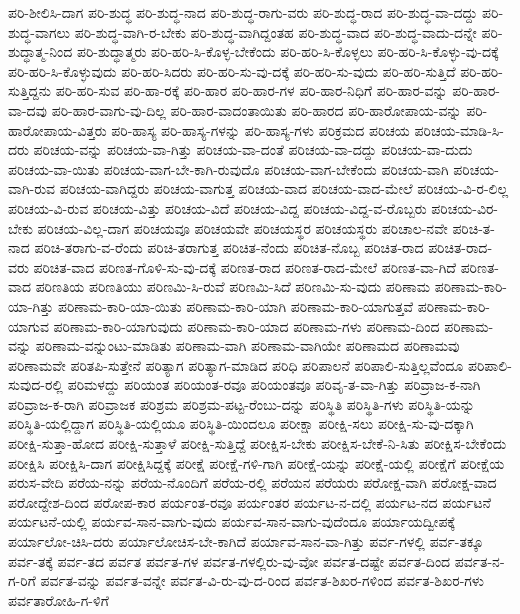 {ಪರಿ-ಶೀಲಿಸಿ-ದಾಗ
ಪರಿ-ಶುದ್ಧ
ಪರಿ-ಶುದ್ಧ-ನಾದ
ಪರಿ-ಶುದ್ಧ-ರಾಗು-ವರು
ಪರಿ-ಶುದ್ಧ-ರಾದ
ಪರಿ-ಶುದ್ಧ-ವಾ-ದದ್ದು
ಪರಿ-ಶುದ್ಧ-ವಾಗಲು
ಪರಿ-ಶುದ್ಧ-ವಾಗಿ-ರ-ಬೇಕು
ಪರಿ-ಶುದ್ಧ-ವಾಗಿದ್ದಂತಹ
ಪರಿ-ಶುದ್ಧ-ವಾದ
ಪರಿ-ಶುದ್ಧ-ವಾದು-ದನ್ನೇ
ಪರಿ-ಶುದ್ಧಾತ್ಮ-ನಿಂದ
ಪರಿ-ಶುದ್ಧಾತ್ಮರು
ಪರಿ-ಹರಿ-ಸಿ-ಕೊಳ್ಳ-ಬೇಕೆಂದು
ಪರಿ-ಹರಿ-ಸಿ-ಕೊಳ್ಳಲು
ಪರಿ-ಹರಿ-ಸಿ-ಕೊಳ್ಳು-ವು-ದಕ್ಕೆ
ಪರಿ-ಹರಿ-ಸಿ-ಕೊಳ್ಳುವುದು
ಪರಿ-ಹರಿ-ಸಿದರು
ಪರಿ-ಹರಿ-ಸು-ವು-ದಕ್ಕೆ
ಪರಿ-ಹರಿ-ಸು-ವುದು
ಪರಿ-ಹರಿ-ಸುತ್ತಿದೆ
ಪರಿ-ಹರಿ-ಸುತ್ತಿದ್ದನು
ಪರಿ-ಹರಿ-ಸುವ
ಪರಿ-ಹಾ-ರಕ್ಕೆ
ಪರಿ-ಹಾರ
ಪರಿ-ಹಾರ-ಗಳ
ಪರಿ-ಹಾರ-ನಿಧಿಗೆ
ಪರಿ-ಹಾರ-ವನ್ನು
ಪರಿ-ಹಾರ-ವಾ-ದವು
ಪರಿ-ಹಾರ-ವಾಗು-ವು-ದಿಲ್ಲ
ಪರಿ-ಹಾರ-ವಾದಂತಾಯಿತು
ಪರಿ-ಹಾರದ
ಪರಿ-ಹಾರೋಪಾಯ-ವನ್ನು
ಪರಿ-ಹಾರೋಪಾಯ-ವಿತ್ತರು
ಪರಿ-ಹಾಸ್ಯ
ಪರಿ-ಹಾಸ್ಯ-ಗಳನ್ನು
ಪರಿ-ಹಾಸ್ಯ-ಗಳು
ಪರಿಕ್ರಮದ
ಪರಿಚಯ
ಪರಿಚಯ-ಮಾಡಿ-ಸಿ-ದರು
ಪರಿಚಯ-ವನ್ನು
ಪರಿಚಯ-ವಾ-ಗಿತ್ತು
ಪರಿಚಯ-ವಾ-ದಂತೆ
ಪರಿಚಯ-ವಾ-ದದ್ದು
ಪರಿಚಯ-ವಾ-ದುದು
ಪರಿಚಯ-ವಾ-ಯಿತು
ಪರಿಚಯ-ವಾಗ-ಬೇ-ಕಾಗಿ-ರುವುದೊ
ಪರಿಚಯ-ವಾಗ-ಬೇಕೆಂದು
ಪರಿಚಯ-ವಾಗಿ
ಪರಿಚಯ-ವಾಗಿ-ರುವ
ಪರಿಚಯ-ವಾಗಿದ್ದರು
ಪರಿಚಯ-ವಾಗುತ್ತ
ಪರಿಚಯ-ವಾದ
ಪರಿಚಯ-ವಾದ-ಮೇಲೆ
ಪರಿಚಯ-ವಿ-ರ-ಲಿಲ್ಲ
ಪರಿಚಯ-ವಿ-ರುವ
ಪರಿಚಯ-ವಿತ್ತು
ಪರಿಚಯ-ವಿದೆ
ಪರಿಚಯ-ವಿದ್ದ
ಪರಿಚಯ-ವಿದ್ದ-ವ-ರೊಬ್ಬರು
ಪರಿಚಯ-ವಿರ-ಬೇಕು
ಪರಿಚಯ-ವಿಲ್ಲ-ದಾಗ
ಪರಿಚಯವೂ
ಪರಿಚಯವೇ
ಪರಿಚಯಸ್ಥರ
ಪರಿಚಯಸ್ಥರು
ಪರಿಚಾಲ-ನವೇ
ಪರಿಚಿ-ತ-ನಾದ
ಪರಿಚಿ-ತರಾಗು-ವ-ರೆಂದು
ಪರಿಚಿ-ತರಾಗುತ್ತ
ಪರಿಚಿತ-ನೆಂದು
ಪರಿಚಿತ-ನೊಬ್ಬ
ಪರಿಚಿತ-ರಾದ
ಪರಿಚಿತ-ರಾದ-ವರು
ಪರಿಚಿತ-ವಾದ
ಪರಿಣತ-ಗೊಳಿ-ಸು-ವು-ದಕ್ಕೆ
ಪರಿಣತ-ರಾದ
ಪರಿಣತ-ರಾದ-ಮೇಲೆ
ಪರಿಣತ-ವಾ-ಗಿದೆ
ಪರಿಣತ-ವಾದ
ಪರಿಣತಿಯ
ಪರಿಣತಿಯು
ಪರಿಣಮಿ-ಸಿ-ರುವೆ
ಪರಿಣಮಿ-ಸಿದೆ
ಪರಿಣಮಿ-ಸು-ವುದು
ಪರಿಣಾಮ
ಪರಿಣಾಮ-ಕಾರಿ-ಯಾ-ಗಿತ್ತು
ಪರಿಣಾಮ-ಕಾರಿ-ಯಾ-ಯಿತು
ಪರಿಣಾಮ-ಕಾರಿ-ಯಾಗಿ
ಪರಿಣಾಮ-ಕಾರಿ-ಯಾಗುತ್ತವೆ
ಪರಿಣಾಮ-ಕಾರಿ-ಯಾಗುವ
ಪರಿಣಾಮ-ಕಾರಿ-ಯಾಗುವುದು
ಪರಿಣಾಮ-ಕಾರಿ-ಯಾದ
ಪರಿಣಾಮ-ಗಳು
ಪರಿಣಾಮ-ದಿಂದ
ಪರಿಣಾಮ-ವನ್ನು
ಪರಿಣಾಮ-ವನ್ನುಂಟು-ಮಾಡಿತು
ಪರಿಣಾಮ-ವಾಗಿ
ಪರಿಣಾಮ-ವಾಗಿಯೇ
ಪರಿಣಾಮದ
ಪರಿಣಾಮವು
ಪರಿಣಾಮವೇ
ಪರಿತಪಿ-ಸುತ್ತೇನೆ
ಪರಿತ್ಯಾಗ
ಪರಿತ್ಯಾಗ-ಮಾಡಿದ
ಪರಿಧಿ
ಪರಿಪಾಲನೆ
ಪರಿಪಾಲಿ-ಸುತ್ತಿಲ್ಲವೆಂದೂ
ಪರಿಪಾಲಿ-ಸುವುದ-ರಲ್ಲಿ
ಪರಿಮಳದ್ದು
ಪರಿಯಂತ
ಪರಿಯಂತ-ರವೂ
ಪರಿಯಂತವೂ
ಪರಿವೃ-ತ-ವಾ-ಗಿತ್ತು
ಪರಿವ್ರಾಜ-ಕ-ನಾಗಿ
ಪರಿವ್ರಾಜ-ಕ-ರಾಗಿ
ಪರಿವ್ರಾಜಕ
ಪರಿಶ್ರಮ
ಪರಿಶ್ರಮ-ಪಟ್ಟ-ರೆಂಬು-ದನ್ನು
ಪರಿಸ್ಥಿತಿ
ಪರಿಸ್ಥಿತಿ-ಗಳು
ಪರಿಸ್ಥಿತಿ-ಯನ್ನು
ಪರಿಸ್ಥಿತಿ-ಯಲ್ಲಿದ್ದಾಗ
ಪರಿಸ್ಥಿತಿ-ಯಲ್ಲಿಯೂ
ಪರಿಸ್ಥಿತಿ-ಯಿಂದಲೂ
ಪರೀಕ್ಷಾ
ಪರೀಕ್ಷಿ-ಸಲು
ಪರೀಕ್ಷಿ-ಸು-ವು-ದಕ್ಕಾಗಿ
ಪರೀಕ್ಷಿ-ಸುತ್ತಾ-ಹೋದ
ಪರೀಕ್ಷಿ-ಸುತ್ತಾಳೆ
ಪರೀಕ್ಷಿ-ಸುತ್ತಿದ್ದೆ
ಪರೀಕ್ಷಿಸ-ಬೇಕು
ಪರೀಕ್ಷಿಸ-ಬೇಕೆ-ನಿ-ಸಿತು
ಪರೀಕ್ಷಿಸ-ಬೇಕೆಂದು
ಪರೀಕ್ಷಿಸಿ
ಪರೀಕ್ಷಿಸಿ-ದಾಗ
ಪರೀಕ್ಷಿಸಿದ್ದಕ್ಕೆ
ಪರೀಕ್ಷೆ
ಪರೀಕ್ಷೆ-ಗಳಿ-ಗಾಗಿ
ಪರೀಕ್ಷೆ-ಯನ್ನು
ಪರೀಕ್ಷೆ-ಯಲ್ಲಿ
ಪರೀಕ್ಷೆಗೆ
ಪರೀಕ್ಷೆಯ
ಪರುಸ-ವೇದಿ
ಪರೆಯ-ನನ್ನು
ಪರೆಯ-ನೊಂದಿಗೆ
ಪರೆಯ-ರಲ್ಲಿ
ಪರೆಯನ
ಪರೆಯರು
ಪರೋಕ್ಷ-ವಾಗಿ
ಪರೋಕ್ಷ-ವಾದ
ಪರೋದ್ದೇಶ-ದಿಂದ
ಪರೋಪ-ಕಾರ
ಪರ್ಯಂತ-ರವೂ
ಪರ್ಯಂತರ
ಪರ್ಯಟ-ನ-ದಲ್ಲಿ
ಪರ್ಯಟ-ನದ
ಪರ್ಯಟನೆ
ಪರ್ಯಟನೆ-ಯಲ್ಲಿ
ಪರ್ಯವ-ಸಾನ-ವಾಗು-ವುದು
ಪರ್ಯವ-ಸಾನ-ವಾಗು-ವುದೆಂದೂ
ಪರ್ಯಾಯದ್ವೀಪಕ್ಕೆ
ಪರ್ಯಾಲೋ-ಚಿಸಿ-ದರು
ಪರ್ಯಾಲೋಚಿಸ-ಬೇ-ಕಾಗಿದೆ
ಪರ್ಯಾವ-ಸಾನ-ವಾ-ಗಿತ್ತು
ಪರ್ವ-ಗಳಲ್ಲಿ
ಪರ್ವ-ತಕ್ಕೂ
ಪರ್ವ-ತಕ್ಕೆ
ಪರ್ವ-ತದ
ಪರ್ವತ
ಪರ್ವತ-ಗಳ
ಪರ್ವತ-ಗಳಲ್ಲಿರು-ವು-ವೋ
ಪರ್ವತ-ದಷ್ಟೇ
ಪರ್ವತ-ದಿಂದ
ಪರ್ವತ-ನ-ಗ-ರಿಗೆ
ಪರ್ವತ-ವನ್ನು
ಪರ್ವತ-ವನ್ನೇ
ಪರ್ವತ-ವಿ-ರು-ವು-ದ-ರಿಂದ
ಪರ್ವತ-ಶಿಖರ-ಗಳಿಂದ
ಪರ್ವತ-ಶಿಖರ-ಗಳು
ಪರ್ವತಾರೋಹಿ-ಗ-ಳಿಗೆ
}
